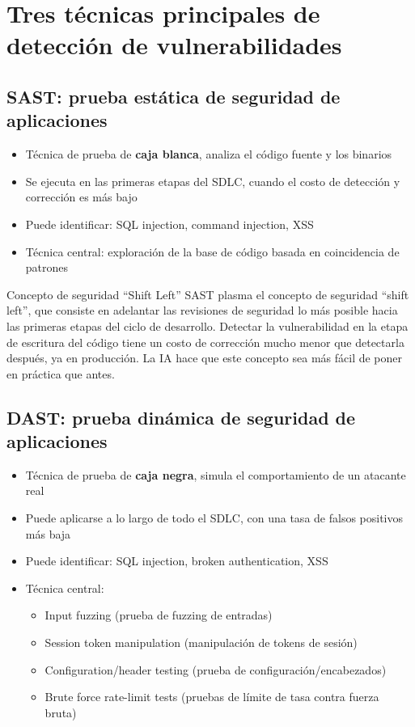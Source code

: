 \section{Tres técnicas principales de detección de vulnerabilidades}

\subsection{SAST: prueba estática de seguridad de aplicaciones}

\begin{itemize}
    \item Técnica de prueba de \textbf{caja blanca}, analiza el código fuente y los binarios
    \item Se ejecuta en las primeras etapas del SDLC, cuando el costo de detección y corrección es más bajo
    \item Puede identificar: SQL injection, command injection, XSS
    \item Técnica central: exploración de la base de código basada en coincidencia de patrones
\end{itemize}

\begin{knowledgebox}{Concepto de seguridad ``Shift Left''}
SAST plasma el concepto de seguridad ``shift left'', que consiste en adelantar las revisiones de seguridad lo más posible hacia las primeras etapas del ciclo de desarrollo. Detectar la vulnerabilidad en la etapa de escritura del código tiene un costo de corrección mucho menor que detectarla después, ya en producción. La IA hace que este concepto sea más fácil de poner en práctica que antes.
\end{knowledgebox}

\subsection{DAST: prueba dinámica de seguridad de aplicaciones}

\begin{itemize}
    \item Técnica de prueba de \textbf{caja negra}, simula el comportamiento de un atacante real
    \item Puede aplicarse a lo largo de todo el SDLC, con una tasa de falsos positivos más baja
    \item Puede identificar: SQL injection, broken authentication, XSS
    \item Técnica central:
    \begin{itemize}
        \item Input fuzzing (prueba de fuzzing de entradas)
        \item Session token manipulation (manipulación de tokens de sesión)
        \item Configuration/header testing (prueba de configuración/encabezados)
        \item Brute force rate-limit tests (pruebas de límite de tasa contra fuerza bruta)
    \end{itemize}
\end{itemize}

